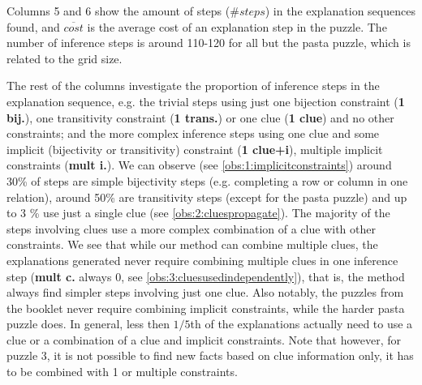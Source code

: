 Columns 5 and 6 show the amount of steps ($\# steps$) in the explanation sequences found, and $\overline{cost}$ is the average cost of an explanation step in the puzzle. The number of inference steps is around 110-120 for all but the pasta puzzle, which is related to the grid size.

The rest of the columns investigate the proportion of inference steps in the explanation sequence, e.g. the trivial steps using just one bijection constraint (\textbf{1 bij.}), one transitivity constraint (\textbf{1 trans.}) or one clue (\textbf{1 clue}) and no other constraints; and the more complex inference steps using one clue and some implicit (bijectivity or transitivity) constraint (\textbf{1 clue+i}), multiple implicit constraints (\textbf{mult i.}). 
We can observe (see \ref{obs:1:implicitconstraints}) around 30\% of steps are simple bijectivity steps (e.g. completing a row or column in one relation), around 50\% are transitivity steps (except for the pasta puzzle) and up to 3 \% use just a single clue (see \ref{obs:2:cluespropagate}). 
The majority of the steps involving clues use a more complex combination of a clue with other constraints. 
We see that while our method can combine multiple clues, the explanations generated never require combining multiple clues in one inference step (\textbf{mult c.} always 0, see \ref{obs:3:cluesusedindependently}), that is, the method always find simpler steps involving just one clue. 
Also notably, the puzzles from the booklet never require combining implicit constraints, while the harder pasta puzzle does. 
In general, less then $1/5$th of the explanations actually need to use a clue or a combination of a clue and implicit constraints.
Note that however, for puzzle 3, it is not possible to find new facts based on clue information only, it has to be combined with 1 or multiple constraints.

